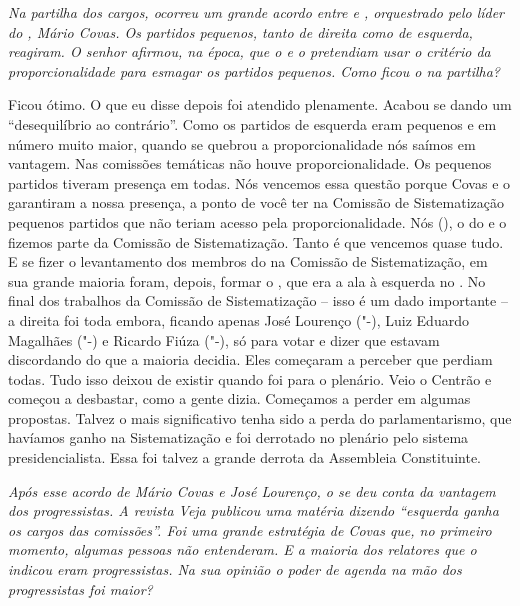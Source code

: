 \medskip

\noindent\emph{Na partilha dos cargos, ocorreu um grande acordo entre  e
, orquestrado pelo líder do , Mário Covas. Os partidos pequenos,
tanto de direita como de esquerda, reagiram. O senhor afirmou, na época,
que o  e o  pretendiam usar o critério da proporcionalidade para
esmagar os partidos pequenos. Como ficou o  na partilha?}

Ficou ótimo. O que eu disse depois foi atendido
plenamente. Acabou se dando um ``desequilíbrio ao contrário''. Como os
partidos de esquerda eram pequenos e em número muito maior, quando se
quebrou a proporcionalidade nós saímos em vantagem. Nas comissões
temáticas não houve proporcionalidade. Os pequenos partidos tiveram
presença em todas. Nós vencemos essa questão porque Covas e o 
garantiram a nossa presença, a ponto de você ter na Comissão de
Sistematização pequenos partidos que não teriam acesso pela
proporcionalidade. Nós (), o do e o  fizemos parte da Comissão
de Sistematização. Tanto é que vencemos quase tudo. E se fizer o
levantamento dos membros do  na Comissão de Sistematização, em sua
grande maioria foram, depois, formar o , que era a ala à esquerda no
. No final dos trabalhos da Comissão de Sistematização -- isso é um
dado importante -- a direita foi toda embora, ficando apenas José
Lourenço ("-), Luiz Eduardo Magalhães ("-) e Ricardo Fiúza
("-), só para votar e dizer que estavam discordando do que a maioria
decidia. Eles começaram a perceber que perdiam todas. Tudo isso deixou
de existir quando foi para o plenário. Veio o Centrão e começou a
desbastar, como a gente dizia. Começamos a perder em algumas propostas.
Talvez o mais significativo tenha sido a perda do parlamentarismo, que
havíamos ganho na Sistematização e foi derrotado no plenário pelo
sistema presidencialista. Essa foi talvez a grande derrota da Assembleia
Constituinte.

\medskip

\noindent\emph{Após esse acordo de Mário Covas e José Lourenço, o  se deu
conta da vantagem dos progressistas. A revista \emph{Veja} publicou uma
matéria dizendo ``esquerda ganha os cargos das comissões''. Foi uma
grande estratégia de Covas que, no primeiro momento, algumas pessoas não
entenderam. E a maioria dos relatores que o  indicou eram
progressistas. Na sua opinião o poder de agenda na mão dos progressistas
foi maior?}

